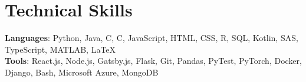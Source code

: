 \documentclass[letterpaper,11pt]{article}
\newcommand{\CC}{C\nolinebreak\hspace{-.05em}\raisebox{.4ex}{\tiny\bf +}\nolinebreak\hspace{-.10em}\raisebox{.4ex}{\tiny\bf +}}
\def\CC{{C\nolinebreak[4]\hspace{-.05em}\raisebox{.4ex}{\tiny\bf ++}}}
\begin{document}
\section{Technical Skills}
 \begin{itemize}[leftmargin=0.15in, label={}]
    \small{\item{
     \textbf{Languages}{: Python, Java, C, \CC, JavaScript, HTML, CSS, R, SQL, Kotlin, SAS, TypeScript, MATLAB, LaTeX}\\
     \textbf{Tools}{: React.js, Node.js, Gatsby.js, Flask, Git, Pandas, PyTest, PyTorch, Docker, Django, Bash, Microsoft Azure, MongoDB} \\
    }}
 \end{itemize}
\end{document}

